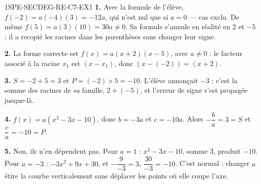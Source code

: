 \begin{corrige}{1SPE-SECDEG-RE-C7-EX1}
\textbf{1.} Avec la formule de l'élève, $f(-2) = a(-4)(3) = -12a$, qui n'est nul
que si $a = 0$ — cas exclu. De même $f(5) = a(3)(10) = 30a \neq 0$. Sa formule
s'annule en réalité en $2$ et $-5$ : il a recopié les racines dans les
parenthèses sans changer leur signe.

\textbf{2.} La forme correcte est $f(x) = a(x + 2)(x - 5)$, avec $a \neq 0$ :
le facteur associé à la racine $x_1$ est $(x - x_1)$, donc $(x - (-2)) = (x+2)$.

\textbf{3.} $S = -2 + 5 = 3$ et $P = (-2) \times 5 = -10$. L'élève annonçait
$-3$ : c'est la somme des racines de \emph{sa} famille, $2 + (-5)$, et l'erreur
de signe s'est propagée jusque-là.

\textbf{4.} $f(x) = a(x^2 - 3x - 10)$, donc $b = -3a$ et $c = -10a$. Alors
$-\dfrac{b}{a} = 3 = S$ et $\dfrac{c}{a} = -10 = P$.

\textbf{5.} Non, ils n'en dépendent pas. Pour $a = 1$ : $x^2 - 3x - 10$, somme
$3$, produit $-10$. Pour $a = -3$ : $-3x^2 + 9x + 30$, et
$-\dfrac{9}{-3} = 3$, $\dfrac{30}{-3} = -10$. C'est normal : changer $a$ étire
la courbe verticalement sans déplacer les points où elle coupe l'axe.
\end{corrige}

